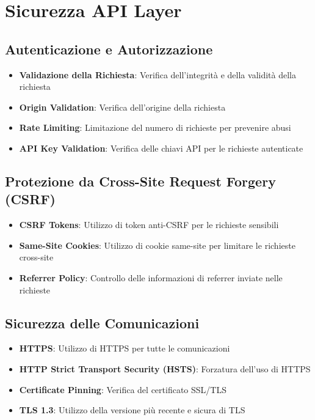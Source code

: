 \section{Sicurezza API Layer}

\subsection{Autenticazione e Autorizzazione}
\begin{itemize}
    \item \textbf{Validazione della Richiesta}: Verifica dell'integrità e della validità della richiesta
    \item \textbf{Origin Validation}: Verifica dell'origine della richiesta
    \item \textbf{Rate Limiting}: Limitazione del numero di richieste per prevenire abusi
    \item \textbf{API Key Validation}: Verifica delle chiavi API per le richieste autenticate
\end{itemize}

\subsection{Protezione da Cross-Site Request Forgery (CSRF)}
\begin{itemize}
    \item \textbf{CSRF Tokens}: Utilizzo di token anti-CSRF per le richieste sensibili
    \item \textbf{Same-Site Cookies}: Utilizzo di cookie same-site per limitare le richieste cross-site
    \item \textbf{Referrer Policy}: Controllo delle informazioni di referrer inviate nelle richieste
\end{itemize}

\subsection{Sicurezza delle Comunicazioni}
\begin{itemize}
    \item \textbf{HTTPS}: Utilizzo di HTTPS per tutte le comunicazioni
    \item \textbf{HTTP Strict Transport Security (HSTS)}: Forzatura dell'uso di HTTPS
    \item \textbf{Certificate Pinning}: Verifica del certificato SSL/TLS
    \item \textbf{TLS 1.3}: Utilizzo della versione più recente e sicura di TLS
\end{itemize}

